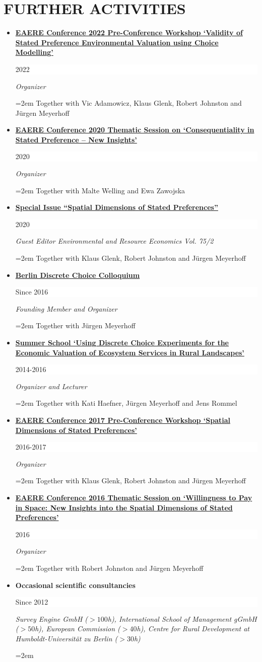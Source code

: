 \documentclass[paper=a4,fontsize=11pt]{scrartcl} %
\newcommand{\NewPart}[2]{\section*{\uppercase{#1} #2}}
\newcommand{\EducationEntry}[4]{
		\noindent \textbf{#1} \hfill      %
		\colorbox{White}{%
			\parbox{6em}{%
			\hfill\color{Black}#2}} \par  %
		\noindent \textit{#3} \par        %
		\noindent\hangindent=2em\hangafter=0 \small #4 %
		\normalsize \par}
\begin{document}
\NewPart{Further Activities}{}
\begin{itemize}




\item \EducationEntry{\href{http://www.eaere-conferences.org/index.php?y=2021&p=261}{EAERE Conference 2022 Pre-Conference Workshop `Validity of Stated \newline Preference Environmental Valuation using Choice Modelling'}}{2022}{Organizer}{Together with Vic Adamowicz, Klaus Glenk, Robert Johnston and Jürgen Meyerhoff}


\item \EducationEntry{\href{http://fleximeets.com/eaere2020/?p=programme}{EAERE Conference 2020 Thematic Session on `Consequentiality in Stated Preference – New Insights'}}{2020}{Organizer}{Together with Malte Welling and Ewa Zawojska}

\item 
\EducationEntry{\href{https://link.springer.com/journal/10640/75/2}{Special Issue ``Spatial Dimensions of Stated Preferences''}}{2020}{Guest Editor Environmental and Resource Economics Vol. 75/2}{Together with Klaus Glenk, Robert Johnston and Jürgen Meyerhoff}

\item 
\EducationEntry{\href{http://www.landschaftsoekonomie.tu-berlin.de/menue/berlin_dce_colloquium/}{Berlin Discrete Choice Colloquium}}{Since 2016}{Founding Member and Organizer}{Together with Jürgen Meyerhoff}

\item \EducationEntry{\href{http://communications.ext.zalf.de/sites/dce/SitePages/DCE\%20Summer\%20School.aspx}{Summer School `Using Discrete Choice Experiments for the \newline Economic Valuation of Ecosystem Services in Rural Landscapes'}}{2014-2016}{Organizer and Lecturer}{Together with Kati Haefner, Jürgen Meyerhoff and Jens Rommel}

\item \EducationEntry{\href{http://www.eaere-conferences.org/index.php?p=60}{EAERE Conference 2017 Pre-Conference Workshop `Spatial \newline Dimensions of Stated Preferences'}}{2016-2017}{Organizer}{Together with Klaus Glenk, Robert Johnston and Jürgen Meyerhoff}


\item \EducationEntry{\href{https://eaere2016.ethz.ch/programme/scientific-programme/thematic-sessions.html}{EAERE Conference 2016 Thematic Session on `Willingness to Pay \newline in Space: New Insights into the Spatial Dimensions of Stated \newline Preferences'}}{2016}{Organizer}{Together with Robert Johnston and Jürgen Meyerhoff}

\item \EducationEntry{Occasional scientific consultancies}{Since 2012}{Survey Engine GmbH ($>100$h), International School of Management gGmbH ($>50$h), European Commission ($>40$h), Centre for Rural Development at Humboldt-Universität zu Berlin ($>30$h)}{}


\end{itemize}
\end{document}

